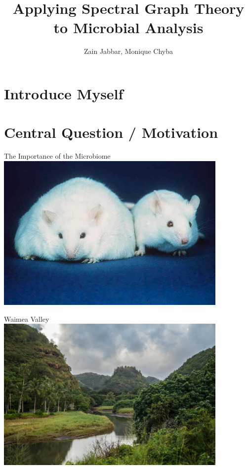 \documentclass{beamer}
\title{Applying Spectral Graph Theory to Microbial Analysis}
\author{Zain Jabbar, Monique Chyba}
\begin{document}
\maketitle
 
\section{Introduce Myself}
\section{Central Question / Motivation}
\begin{frame}{The Importance of the Microbiome}
  \centering \includegraphics[width=0.85\textwidth]{fatmouse.jpg}
\end{frame}

\begin{frame}{Waimea Valley}
  \centering \includegraphics[width=0.85\textwidth]{waimea.jpg}
\end{frame}
\end{document}
